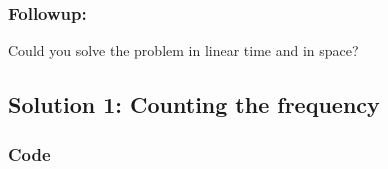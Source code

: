 \documentclass[letterpaper,12pt,english]{book}
\begin{document}
\subsubsection{Follow\sphinxhyphen{}up:}
\label{\detokenize{Sorting/04_SORT_169_Majority_Element:follow-up}}
\sphinxAtStartPar
Could you solve the problem in linear time and in  space?


\subsection{Solution 1: Counting the frequency}
\label{\detokenize{Sorting/04_SORT_169_Majority_Element:solution-1-counting-the-frequency}}

\subsubsection{Code}
\label{\detokenize{Sorting/04_SORT_169_Majority_Element:code}}
\end{document}

